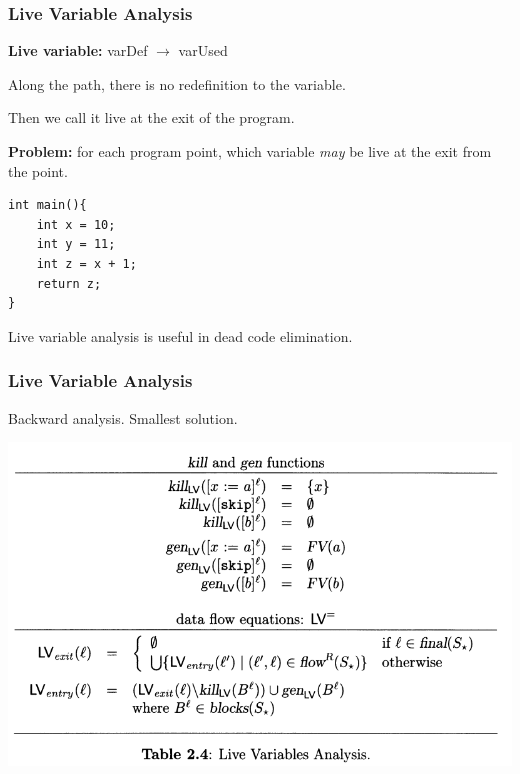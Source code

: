 \documentclass[aspectratio=1610, 13pt]{beamer}
\begin{document}
\begin{frame}[fragile]\frametitle{Live Variable Analysis}
\textbf{Live variable:}  varDef $\longrightarrow$ varUsed

Along the path, there is no redefinition to the variable.

Then we call it live at the exit of the program.

\textbf{Problem:} for each program point, which variable \textit{may} be live at the exit from the point.
\begin{example}
\begin{lstlisting}
int main(){
    int x = 10;
    int y = 11;
    int z = x + 1;
    return z;
}

\end{lstlisting}

\end{example}

Live variable analysis is useful in dead code elimination.
\end{frame}


\begin{frame}\frametitle{Live Variable Analysis}
Backward analysis. Smallest solution.
\begin{center}
\includegraphics[scale=0.4]{lv.png}
\end{center}
\end{frame}
\end{document}
